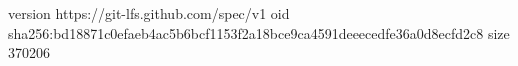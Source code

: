 version https://git-lfs.github.com/spec/v1
oid sha256:bd18871c0efaeb4ac5b6bcf1153f2a18bce9ca4591deeecedfe36a0d8ecfd2c8
size 370206
